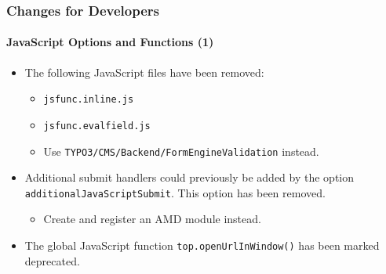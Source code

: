 
\begin{frame}[fragile]
	\frametitle{Changes for Developers}
	\framesubtitle{JavaScript Options and Functions (1)}

	\begin{itemize}
		\item The following JavaScript files have been removed:

			\begin{itemize}
				\item \texttt{jsfunc.inline.js}
				\item \texttt{jsfunc.evalfield.js}
			\end{itemize}

			\begin{itemize}\smaller
				\item[\ding{228}] Use \texttt{TYPO3/CMS/Backend/FormEngineValidation} instead.
			\end{itemize}\normalsize

		\item Additional submit handlers could previously be added by the option \texttt{additionalJavaScriptSubmit}.
			This option has been removed.

			\begin{itemize}\smaller
				\item[\ding{228}] Create and register an AMD module instead.
			\end{itemize}\normalsize

		\item The global JavaScript function \texttt{top.openUrlInWindow()} has been marked deprecated.

	\end{itemize}

\end{frame}


